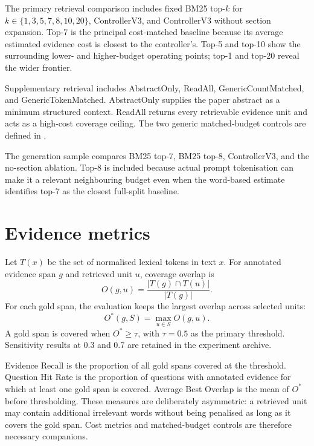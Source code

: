 The primary retrieval comparison includes fixed BM25 top-$k$ for $k\in\{1,3,5,7,8,10,20\}$, ControllerV3, and ControllerV3 without section expansion. Top-7 is the principal cost-matched baseline because its average estimated evidence cost is closest to the controller's. Top-5 and top-10 show the surrounding lower- and higher-budget operating points; top-1 and top-20 reveal the wider frontier.

Supplementary retrieval includes AbstractOnly, ReadAll, GenericCountMatched, and GenericTokenMatched. AbstractOnly supplies the paper abstract as a minimum structured context. ReadAll returns every retrievable evidence unit and acts as a high-cost coverage ceiling. The two generic matched-budget controls are defined in .

The generation sample compares BM25 top-7, BM25 top-8, ControllerV3, and the no-section ablation. Top-8 is included because actual prompt tokenisation can make it a relevant neighbouring budget even when the word-based estimate identifies top-7 as the closest full-split baseline.

\section{Evidence metrics}

Let $T(x)$ be the set of normalised lexical tokens in text $x$. For annotated evidence span $g$ and retrieved unit $u$, coverage overlap is
\begin{equation}
    O(g,u)=\frac{|T(g)\cap T(u)|}{|T(g)|}.
\end{equation}
For each gold span, the evaluation keeps the largest overlap across selected units:
\begin{equation}
    O^*(g,S)=\max_{u\in S}O(g,u).
\end{equation}
A gold span is covered when $O^*\geq\tau$, with $\tau=0.5$ as the primary threshold. Sensitivity results at 0.3 and 0.7 are retained in the experiment archive.

Evidence Recall is the proportion of all gold spans covered at the threshold. Question Hit Rate is the proportion of questions with annotated evidence for which at least one gold span is covered. Average Best Overlap is the mean of $O^*$ before thresholding. These measures are deliberately asymmetric: a retrieved unit may contain additional irrelevant words without being penalised as long as it covers the gold span. Cost metrics and matched-budget controls are therefore necessary companions.

